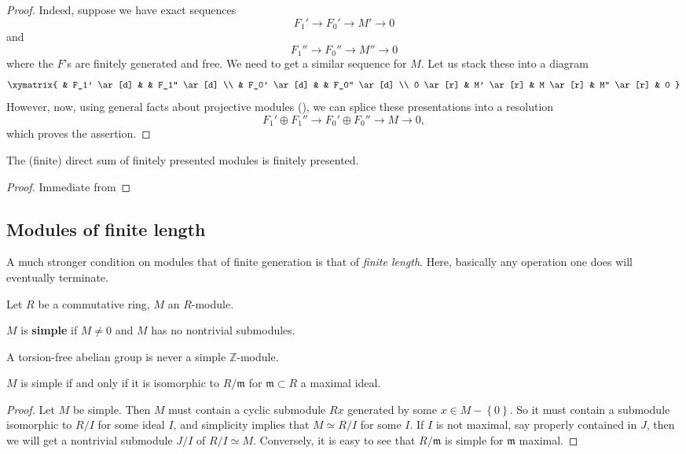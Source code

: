 \begin{proof} 
Indeed, suppose we have  exact sequences
\[ F_1' \to F_0' \to M' \to 0   \]
and
\[ F_1'' \to F_0'' \to M'' \to 0  \]
where the $F$'s are finitely generated and free. 
We need to get a similar sequence for $M$. 
Let us stack these into a diagram
\[ \xymatrix{
& F_1' \ar[d] & & F_1'' \ar[d]  \\
& F_0' \ar[d]  & & F_0'' \ar[d] \\
0 \ar[r] &  M' \ar[r] &  M \ar[r] &  M'' \ar[r] &  0
}\]
However, now, using general facts about projective modules (\rref{}), we can
splice these presentations into a resolution
\[ F_1' \oplus F_1'' \to F_0' \oplus F_0'' \to M \to 0,  \]
which proves the assertion.
\end{proof} 


\begin{corollary} 
The (finite) direct sum of finitely presented modules is finitely presented.
\end{corollary} 
\begin{proof} 
Immediate from 
\end{proof} 

\subsection{Modules of finite length}

A much stronger condition on modules that of finite generation is that of \emph{finite
length}. Here, basically any operation one does will eventually terminate. 

Let $R$ be a commutative ring, $M$ an $R$-module. 

\begin{definition} 
$M$ is \textbf{simple} if $M \neq 0$ and $M$ has no nontrivial submodules.
\end{definition} 


\begin{exercise} 
A torsion-free abelian group is never a simple $\mathbb{Z}$-module.
\end{exercise} 

\begin{proposition} 
$M$ is simple if and only if it is isomorphic to $R/\mathfrak{m}$ for $\mathfrak{m} \subset
R$ a maximal ideal.
\end{proposition} 

\begin{proof} Let $M$ be simple. Then 
$M$ must contain a cyclic submodule $Rx$ generated by some $x \in
M - \left\{0\right\}$. So it must contain a submodule isomorphic to $R/I$
for some ideal $I$, and
simplicity implies that $M \simeq R/I$ for some $I$. If $I$ is not maximal,
say properly contained in $J$,
then we will get a nontrivial submodule $J/I$ of $R/I \simeq M$. Conversely,
it is easy to see
that $R/\mathfrak{m}$ is simple for $\mathfrak{m}$ maximal.
\end{proof} 


